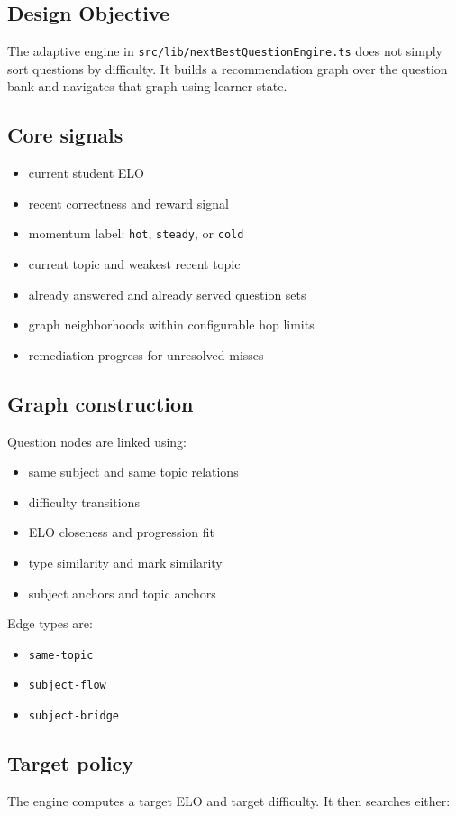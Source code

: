 \documentclass[10pt,twocolumn,a4paper]{article}
\newcommand{\tech}[1]{\texttt{#1}}
\begin{document}
\subsection{Design Objective}
The adaptive engine in \tech{src/lib/nextBestQuestionEngine.ts} does not simply sort questions by difficulty. It builds a recommendation graph over the question bank and navigates that graph using learner state.

\subsection{Core signals}
\begin{itemize}
  \item current student ELO
  \item recent correctness and reward signal
  \item momentum label: \tech{hot}, \tech{steady}, or \tech{cold}
  \item current topic and weakest recent topic
  \item already answered and already served question sets
  \item graph neighborhoods within configurable hop limits
  \item remediation progress for unresolved misses
\end{itemize}

\subsection{Graph construction}
Question nodes are linked using:
\begin{itemize}
  \item same subject and same topic relations
  \item difficulty transitions
  \item ELO closeness and progression fit
  \item type similarity and mark similarity
  \item subject anchors and topic anchors
\end{itemize}

Edge types are:
\begin{itemize}
  \item \tech{same-topic}
  \item \tech{subject-flow}
  \item \tech{subject-bridge}
\end{itemize}

\subsection{Target policy}
The engine computes a target ELO and target difficulty. It then searches either:
\end{document}
